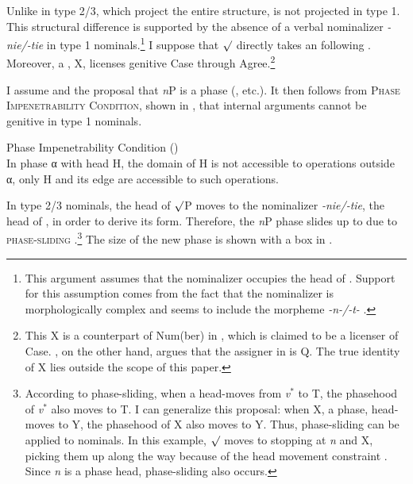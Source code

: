 \documentclass[output=paper,colorlinks,citecolor=brown,newtxmath]{langsci/langscibook}
\begin{document}
\largerpage[2]
\noindent
Unlike in type 2/3, which project the entire structure,  is not projected in type 1.
This structural difference is supported by
the absence of a verbal nominalizer \textit{-nie/-tie} in type 1 nominals.\footnote{This argument assumes that the nominalizer occupies the head of . Support for this assumption comes from the fact that the nominalizer is morphologically complex and seems to include the  morpheme \textit{-n-/-t-} \citep{Babby1997}.}
I suppose that $\surd$ directly takes an  following \citet{Harley2009a}.
Moreover, a , X, licenses genitive Case through Agree.\footnote{This X is a counterpart of Num(ber) in \citet{Carstens2001}, which is claimed to be a licenser of Case. \citet{bailyn2012}, on the other hand, argues that the  assigner in  is Q. The true identity of X lies outside the scope of this paper.}

I assume   and the proposal that \textit{n}P is a phase (\citealt{Carstens2001, Arad2003, hicks2009}, etc.). It then follows from \textsc{Phase Impenetrability Condition}, shown in , that internal arguments cannot be genitive in type 1 nominals.


\begin{exe}
\ex\label{PIC}  {Phase Impenetrability Condition ()}\\
In phase α with head H, the domain of H is not accessible to
operations outside α, only H and its edge are accessible to such operations.\\
\end{exe}
\vspace{-2em}
\hfill \citep[108]{Chomsky2000}
\vspace{1em}

\noindent In type 2/3 nominals, the head of $\surd$P moves to the nominalizer \textit{-nie/-tie}, the head of , in order to derive its form.
Therefore, the \textit{n}P phase slides up to  due to \textsc{phase-sliding} \citep{Gallego2010}.\footnote{According to phase-sliding, when a  head-moves from \textit{v}$^*$ to T, the phasehood of \textit{v}$^*$ also moves to T. I can generalize this proposal: when X, a phase, head-moves to Y,  the phasehood of X also moves to Y. Thus, phase-sliding can be applied to  nominals. In this example, $\surd$ moves to  stopping at \textit{n} and X, picking them up along the way because of the head movement constraint \citep{Travis1984, Matushansky2006}. Since \textit{n} is a phase head, phase-sliding also occurs.} The size of the new phase is shown with a box in .
\end{document}
